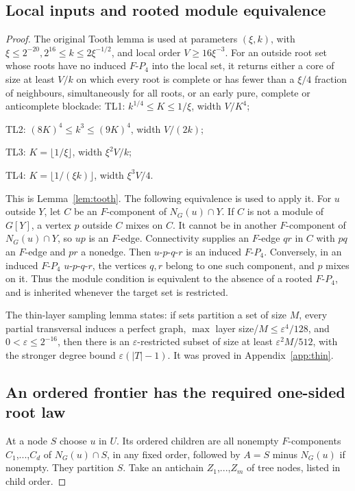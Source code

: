 \documentclass[11pt,a4paper]{article}
\theoremstyle{definition}
\theoremstyle{remark}
\numberwithin{equation}{section}
\begin{document}
\subsection{Local inputs and rooted module equivalence}\label{subsec:rp5-local}
\begin{proof}
The original Tooth lemma is used at parameters \((\xi,\allowbreak k)\), with \(\xi\le\allowbreak 2^{-20},\allowbreak  2^{16}\le\allowbreak k\le\allowbreak 2\xi^{-1/2}\), and local order \(V\ge\allowbreak 16\xi^{-3}\). For an outside root set whose roots have no induced \(F\text{-}P_{4}\) into the local set, it returns either a core of size at least \(V/k\) on which every root is complete or has fewer than a \(\xi/4\) fraction of neighbours, simultaneously for all roots, or an early pure, complete or anticomplete blockade:
\noindent TL1: \(k^{1/4}\le\allowbreak K\le\allowbreak 1/\xi\), width \(V/K^{4}\);\par
\noindent TL2: \((8K)^{4}\le\allowbreak k^{3}\le\allowbreak (9K)^{4}\), width \(V/(2k)\);\par
\noindent TL3: \(K=\lfloor 1/\xi\rfloor\), width \(\xi^{2} V/k\);\par
\noindent TL4: \(K=\lfloor 1/(\xi k)\rfloor\), width \(\xi^{3} V/4\).\par
This is Lemma~\ref{lem:tooth}. The following equivalence is used to apply it. For \(u\) outside \(Y\), let \(C\) be an \(F\)-component of \(N_{G}(u) \cap  Y\). If \(C\) is not a module of \(G[Y]\), a vertex \(p\) outside \(C\) mixes on \(C\). It cannot be in another \(F\)-component of \(N_{G}(u) \cap  Y\), so \(up\) is an \(F\)-edge. Connectivity supplies an \(F\)-edge \(qr\) in \(C\) with \(pq\) an \(F\)-edge and \(pr\) a nonedge. Then \(u\text{-}p\text{-}q\text{-}r\) is an induced \(F\text{-}P_{4}\). Conversely, in an induced \(F\text{-}P_{4}\) \(u\text{-}p\text{-}q\text{-}r\), the vertices \(q,\allowbreak r\) belong to one such component, and \(p\) mixes on it. Thus the module condition is equivalent to the absence of a rooted \(F\text{-}P_{4}\), and is inherited whenever the target set is restricted.

The thin-layer sampling lemma states: if sets partition a set of size \(M\), every partial transversal induces a perfect graph, \(\max \) layer size/\(M\le\allowbreak \varepsilon^{4}/128\), and \(0<\varepsilon\le\allowbreak 2^{-16}\), then there is an \(\varepsilon\)-restricted subset of size at least \(\varepsilon^{2} M/512\), with the stronger degree bound \(\varepsilon(|T|-1)\). It was proved in Appendix~\ref{app:thin}.
\subsection{An ordered frontier has the required one-sided root law}\label{subsec:rp5-frontier-law}
At a node \(S\) choose \(u\) in \(U\). Its ordered children are all nonempty \(F\)-components \(C_{1}\),...,\(C_{d}\) of \(N_{G}(u) \cap  S\), in any fixed order, followed by \(A=S\) minus \(N_{G}(u)\) if nonempty. They partition \(S\). Take an antichain \(Z_{1}\),...,\(Z_{m}\) of tree nodes, listed in child order.


\end{proof}
\end{document}
